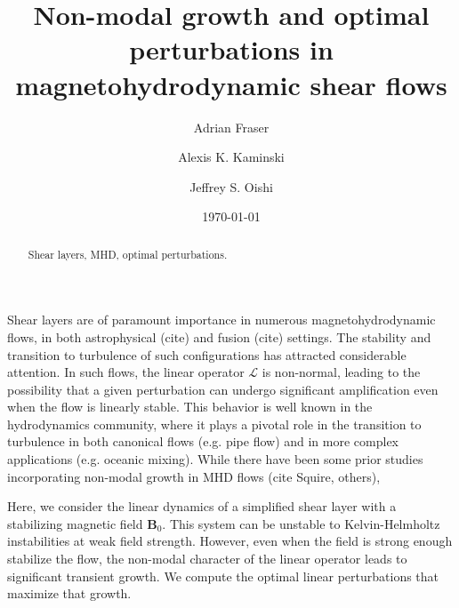 \documentclass[%
 reprint,
 amsmath,amssymb,
 aps,
]{revtex4-2}
\newcommand{\Bzero}{\mathbf{B}_0}
\newcommand{\linop}{\mathcal{L}}
\begin{document}

\title{Non-modal growth and optimal perturbations in magnetohydrodynamic shear flows}

\author{Adrian Fraser}
%

\author{Alexis K. Kaminski}
%
\author{Jeffrey S. Oishi}
%

\date{\today}%

\begin{abstract}
Shear layers, MHD, optimal perturbations.
\end{abstract}

\maketitle

Shear layers are of paramount importance in numerous magnetohydrodynamic flows, in both astrophysical (cite) and fusion (cite) settings. The stability and transition to turbulence of such configurations has attracted considerable attention. In such flows, the linear operator $\linop$ is non-normal, leading to the possibility that a given perturbation can undergo significant amplification even when the flow is linearly stable. This behavior is well known in the hydrodynamics community, where it plays a pivotal role in the transition to turbulence in both canonical flows (e.g. pipe flow) and in more complex applications (e.g. oceanic mixing). While there  have been some prior studies incorporating non-modal growth in MHD flows (cite Squire, others), 

Here, we consider the linear dynamics of a simplified shear layer with a stabilizing magnetic field $\Bzero$. This system can be unstable to Kelvin-Helmholtz instabilities at weak field strength. However, even when the field is strong enough stabilize the flow, the non-modal character of the linear operator leads to significant transient growth. We compute the optimal linear perturbations that maximize that growth.
\end{document}
